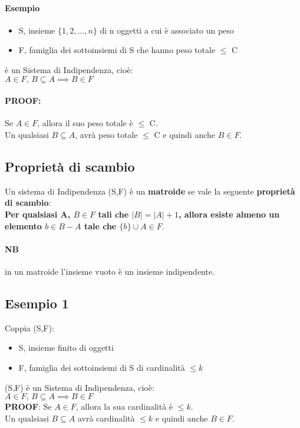 \paragraph*{Esempio}
\begin{itemize}
    \item S, insieme $\{1,2,...,n\}$ di n oggetti a cui è associato un peso
    \item F, famiglia dei sottoinsiemi di S che hanno peso totale $\leq$ C
\end{itemize}
è un Sistema di Indipendenza, cioè:\\
$A \in F, \, B \subseteq A \implies B \in F$\\
\paragraph*{PROOF:} Se $A \in F$, allora il suo peso totale è $\leq$ C.\\
Un qualsiasi $B \subseteq A$, avrà peso totale $\leq$ C e quindi anche $B \in F$.\\
\subsection{Proprietà di scambio}
Un sistema di Indipendenza (S,F) è un \textbf{matroide} se vale la seguente
\textbf{proprietà di scambio}:\\
\textbf{Per qualsiasi A, $B \in F$ tali che $|B|=|A|+1$, allora esiste almeno un elemento
$b \in B-A$ tale che $\{b\}\cup A \in F $}.\\
\paragraph*{NB} in un matroide l'insieme vuoto è un insieme indipendente.
\subsection{Esempio 1}
Coppia (S,F):
\begin{itemize}
    \item S, insieme finito di oggetti
    \item F, famiglia dei sottoinsiemi di S di cardinalità $\leq k$
\end{itemize}
(S,F) è un Sistema di Indipendenza, cioè:\\
$A \in F, \, B \subseteq A \implies B \in F$\\
\textbf{PROOF}: Se $A \in F$, allora la sua cardinalità è $\leq k$.\\
Un qualsiasi $B \subseteq A$ avrà cardinalità $\leq k$ e quindi anche $B \in F$.\\

